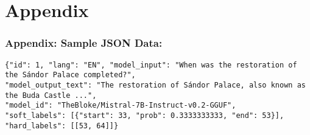 \documentclass{article}
\renewcommand{\normalsize}{\fontsize{10}{12}\selectfont}
\begin{document}
\section*{Appendix}
\small
\subsubsection*{Appendix: Sample JSON Data:}
\begin{verbatim}
{"id": 1, "lang": "EN", "model_input": "When was the restoration of the Sándor Palace completed?", 
"model_output_text": "The restoration of Sándor Palace, also known as the Buda Castle ...", 
"model_id": "TheBloke/Mistral-7B-Instruct-v0.2-GGUF", 
"soft_labels": [{"start": 33, "prob": 0.3333333333, "end": 53}], "hard_labels": [[53, 64]]}
\end{verbatim}
\normalsize
\end{document}
